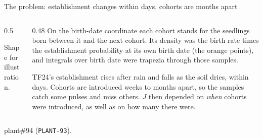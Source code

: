 \documentclass[aspectratio=169,10pt]{beamer}
\newcommand{\src}[1]{\par\vfill{\tiny\color{quiet} #1}}
\newcommand{\illus}{\par{\tiny\color{quiet} Shape for illustration.}}
\begin{document}
\begin{frame}{The problem: establishment changes within days, cohorts are months apart}
  \begin{columns}[T]
    \begin{column}{0.5\textwidth}
      \illus
    \end{column}
    \begin{column}{0.48\textwidth}
      \small
      On the birth-date coordinate each cohort stands for the seedlings born between it and the
      next cohort. Its density was the birth rate times the establishment probability at its own
      birth date (the orange points), and integrals over birth date were trapezia through those
      samples.
      \medskip

      TF24's establishment rises after rain and falls as the soil dries, within days. Cohorts
      are introduced weeks to months apart, so the samples catch some pulses and miss others.
      $J$ then depended on \emph{when} cohorts were introduced, as well as on how many there
      were.
    \end{column}
  \end{columns}
  \src{plant\#94 (\texttt{PLANT-93}).}
\end{frame}
\end{document}
